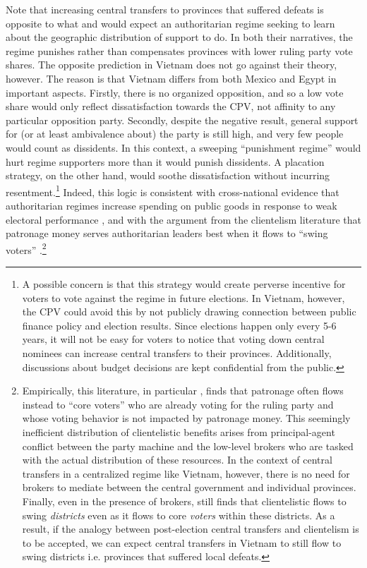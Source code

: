\documentclass[12pt]{article}\usepackage[]{graphicx}\usepackage[]{color}
\newcommand{\1}{\mathbbm{1}}
\begin{document}
Note that increasing central transfers to provinces that suffered defeats is opposite to what \cite{Magaloni2006} and \cite{Blaydes2008} would expect an authoritarian regime seeking to learn about the geographic distribution of support to do. In both their narratives, the regime punishes rather than compensates provinces with lower ruling party vote shares. The opposite prediction in Vietnam does not go against their theory, however. The reason is that Vietnam differs from both Mexico and Egypt in important aspects. Firstly, there is no organized opposition, and so a low vote share would only reflect dissatisfaction towards the CPV, not affinity to any particular opposition party. Secondly, despite the negative result, general support for (or at least ambivalence about) the party is still high, and very few people would count as dissidents. In this context, a sweeping ``punishment regime'' would hurt regime supporters more than it would punish dissidents. A  placation strategy, on the other hand, would soothe dissatisfaction without incurring resentment.\footnote{A possible concern is that this strategy would create perverse incentive for voters to vote against the regime in future elections. In Vietnam, however, the CPV could avoid this by not publicly drawing connection between public finance policy and election results. Since elections happen only every 5-6 years, it will not be easy for voters to notice that voting down central nominees can increase central transfers to their provinces. Additionally, discussions about budget decisions are kept confidential from the public.} Indeed, this logic is consistent with cross-national evidence that authoritarian regimes increase spending on public goods in response to weak electoral performance \citep{Miller2015}, and with the argument from the clientelism literature that patronage money serves authoritarian leaders best when it flows to ``swing voters'' \citep{DixitLondregan1996, Stokes2013}.\footnote{Empirically, this literature, in particular \cite{Stokes2013}, finds that patronage often flows instead to ``core voters'' who are already voting for the ruling party and whose voting behavior is not impacted by patronage money. This seemingly inefficient distribution of clientelistic benefits arises from principal-agent conflict between the party machine and the low-level brokers who are tasked with the actual distribution of these resources. In the context of central transfers in a centralized regime like Vietnam, however, there is no need for brokers to mediate between the central government and individual provinces. Finally, even in the presence of brokers, \cite{Stokes2013} still finds that clientelistic flows to swing \textit{districts} even as it flows to core \textit{voters} within these districts. As a result, if the analogy between post-election central transfers and clientelism is to be accepted, we can expect central transfers in Vietnam to still flow to swing districts i.e. provinces that suffered local defeats.} 
\end{document}
